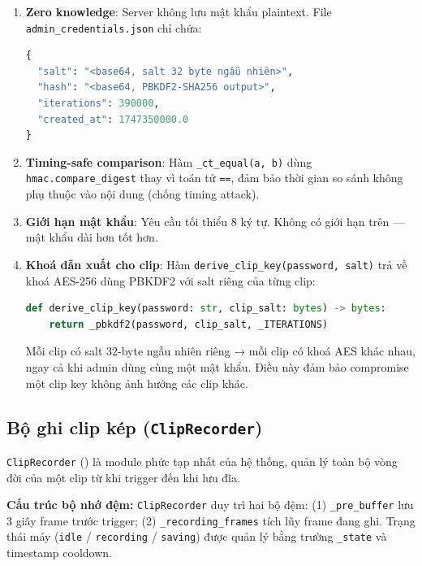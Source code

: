 \begin{enumerate}[1.]
    \item \textbf{Zero knowledge}: Server không lưu mật khẩu plaintext. File
    \texttt{admin\_cre\-den\-tials.json} chỉ chứa:
    \begin{lstlisting}[language=Python, caption={Cấu trúc file admin\_credentials.json}]
{
  "salt": "<base64, salt 32 byte ngẫu nhiên>",
  "hash": "<base64, PBKDF2-SHA256 output>",
  "iterations": 390000,
  "created_at": 1747350000.0
}
    \end{lstlisting}
    
    \item \textbf{Timing-safe comparison}: Hàm \texttt{\_ct\_equal(a, b)} dùng \texttt{hmac.compare\_digest} thay vì toán tử \texttt{==}, đảm bảo thời gian so sánh không phụ thuộc vào nội dung (chống timing attack).
    
    \item \textbf{Giới hạn mật khẩu}: Yêu cầu tối thiểu 8 ký tự. Không có giới hạn trên --- mật khẩu dài hơn tốt hơn.
    
    \item \textbf{Khoá dẫn xuất cho clip}: Hàm \texttt{derive\_clip\_key(password, salt)} trả về khoá AES-256 dùng PBKDF2 với salt riêng của từng clip:
    \begin{lstlisting}[language=Python, caption={Dẫn xuất khoá clip}]
def derive_clip_key(password: str, clip_salt: bytes) -> bytes:
    return _pbkdf2(password, clip_salt, _ITERATIONS)
    \end{lstlisting}
    Mỗi clip có salt 32-byte ngẫu nhiên riêng → mỗi clip có khoá AES khác nhau, ngay cả khi admin dùng cùng một mật khẩu. Điều này đảm bảo compromise một clip key không ảnh hưởng các clip khác.
\end{enumerate}

\subsection{Bộ ghi clip kép (\texttt{ClipRecorder})}
\label{subsec:cliprecorder}

\texttt{ClipRecorder} () là module phức tạp nhất của hệ thống, quản lý toàn bộ vòng đời của một clip từ khi trigger đến khi lưu đĩa.

\textbf{Cấu trúc bộ nhớ đệm:} \texttt{ClipRecorder} duy trì hai bộ đệm: (1) \texttt{\_pre\_buffer} lưu 3 giây frame trước trigger; (2) \texttt{\_recording\_frames} tích lũy frame đang ghi. Trạng thái máy (\texttt{idle} / \texttt{recording} / \texttt{saving}) được quản lý bằng trường \texttt{\_state} và timestamp cooldown.

